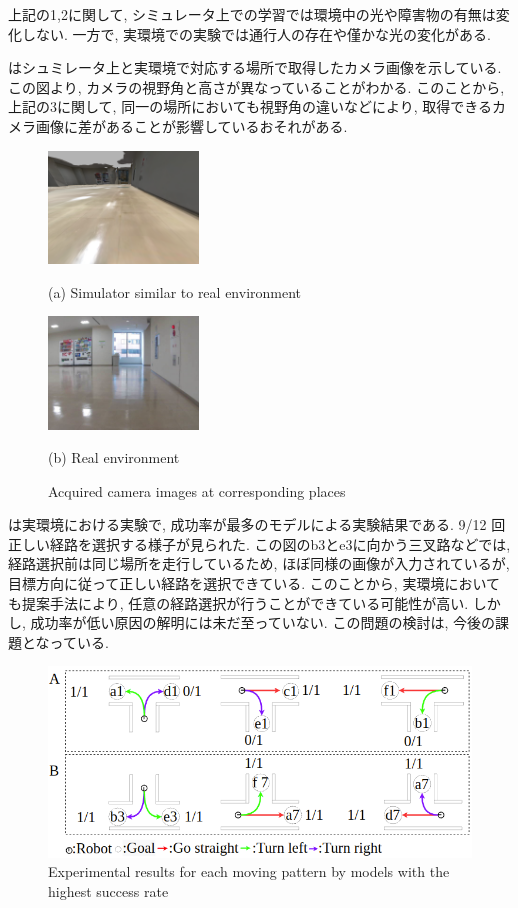 上記の1,2に関して, シミュレータ上での学習では環境中の光や障害物の有無は変化しない. 一方で, 実環境での実験では通行人の存在や僅かな光の変化がある. 
\par
{}はシュミレータ上と実環境で対応する場所で取得したカメラ画像を示している. この図より, カメラの視野角と高さが異なっていることがわかる. このことから, 上記の3に関して, 同一の場所においても視野角の違いなどにより, 取得できるカメラ画像に差があることが影響しているおそれがある.

\begin{figure}[h]
  \centering
  \begin{minipage}[b]{67mm}
    \centering
    \includegraphics[width=40mm]{images/horizonal_sim.png}
    \caption*{(a) Simulator similar to real environment}
  \end{minipage} 
  \begin{minipage}[b]{67mm}
    \centering
    \includegraphics[width=40mm]{images/horizonal_real.png}
    \caption*{(b) Real environment}
  \end{minipage}
  \caption{Acquired camera images at corresponding places}
  \label{Fig:horizonal}
\end{figure}

は実環境における実験で, 成功率が最多のモデルによる実験結果である. 9/12 回正しい経路を選択する様子が見られた. この図のb3とe3に向かう三叉路などでは, 経路選択前は同じ場所を走行しているため, ほぼ同様の画像が入力されているが, 目標方向に従って正しい経路を選択できている. このことから, 実環境においても提案手法により, 任意の経路選択が行うことができている可能性が高い.
しかし, 成功率が低い原因の解明には未だ至っていない. この問題の検討は, 今後の課題となっている.

\begin{figure}[hbtp]
  \centering
 \includegraphics[keepaspectratio, scale=0.40]
      {images/real_model3.png}
 \caption{Experimental results for each moving pattern by models with the highest success rate}
 \label{Fig:real_model3}
\end{figure}

\newpage
